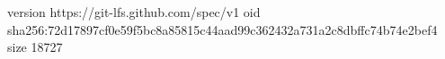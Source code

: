 version https://git-lfs.github.com/spec/v1
oid sha256:72d17897cf0e59f5bc8a85815c44aad99c362432a731a2c8dbffc74b74e2bef4
size 18727
